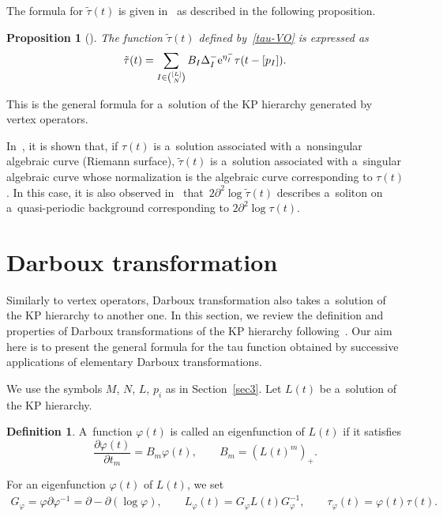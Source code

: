 \documentclass[10pt,a4paper]{amsart}
\numberwithin{equation}{section}
\newtheorem{Proposition}[Theorem]{Proposition}
\theoremstyle{definition}
\newtheorem{Definition}[Theorem]{Definition}
\begin{document}
The formula for $\tilde{\tau}(t)$ is given in~\cite{Nak2021,Nak2024} as described
in the following proposition.


\begin{Proposition}[{\cite{Nak2021,Nak2024}}]\label{VO-solution}
The function $\tilde{\tau}(t)$ defined by~\eqref{tau-VO} is expressed as
\begin{gather}
\tilde{\tau}(t)=\sum_{I\in \binom{[L]}{N}} B_I \Delta^{-}_I {\rm e}^{\eta_I^{-}}\tau(t-[p_I]).
\label{VO}
\end{gather}
\end{Proposition}

This is the general formula for a~solution of the KP hierarchy generated
by vertex operators.

In~\cite{Nak2024}, it is shown that, if $\tau(t)$ is a~solution associated with a~nonsingular algebraic curve (Riemann surface), $\tilde{\tau}(t)$ is a~solution associated with a~singular algebraic curve whose normalization is the algebraic curve corresponding to $\tau(t)$.
In this case,
it is also observed in~\cite{Nak2024} that~$2\partial^2\log \tilde{\tau}(t)$ describes a~soliton on a~quasi-periodic background corresponding to $2\partial^2\log \tau(t)$.

\section{Darboux transformation}\label{sec4}
Similarly to vertex operators, Darboux transformation also takes a~solution of the KP hierarchy to another one.
In this section, we review the definition and properties of Darboux transformations of the KP hierarchy following~\cite{H-van-de-Leur2001, Kakei}. Our aim here is to present the general formula for the tau
function obtained by successive applications of elementary Darboux transformations.

We use the symbols $M$, $N$, $L$, $p_i$ as in Section~\ref{sec3}.
Let $L(t)$ be a~solution of the KP hierarchy.

\begin{Definition} A~function $\varphi(t)$ is called an eigenfunction of $L(t)$ if it satisfies
\[%
\frac{\partial \varphi(t)}{\partial t_m}=B_m \varphi(t),
\qquad
B_m=(L(t)^m)_+.
\]
\end{Definition}


For an eigenfunction $\varphi(t)$ of $L(t)$, we set
\begin{gather*}
G_\varphi=\varphi\partial \varphi^{-1}=\partial-\partial (\log\varphi),
\qquad
L_\varphi(t)=G_\varphi L(t) G_{\varphi}^{-1},
\qquad
\tau_\varphi(t)=\varphi(t)\tau(t).
\end{gather*}
\end{document}
